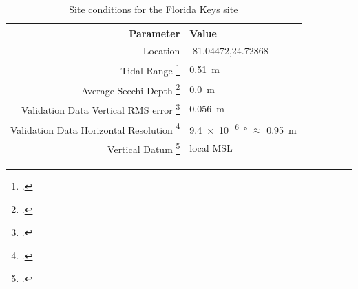 \begin{table}[h]
    \begin{minipage}{0.5\textwidth}
        \centering\begin{tabular}{r l }
            Parameter                                                      & \textbf{Value}                                 \\
            \hline
            Location                                                       & -81.04472,24.72868                             \\
            Tidal Range \footcite{Tidal_data_reanalysis2022}               & \qty{0.51}{m}                                  \\
            Average Secchi Depth \footcite{ACRI-STGlobColourTeam2020}      & \qty{0.0}{m}                                   \\
            Validation Data Vertical RMS error \footcite{Keys2019Lidar}    & \qty{0.056}{m}                                 \\
            Validation Data Horizontal Resolution \footcite{Keys2019Lidar} & \qty{9.4e-6}{ \degree} $\approx$ \qty{0.95}{m} \\
            Vertical Datum \footcite{Keys2019Lidar}                        & local MSL                                      \\
        \end{tabular}
    \end{minipage}
    \caption{Site conditions for the Florida Keys site}
    \label{table:floridasitestats}
\end{table}


